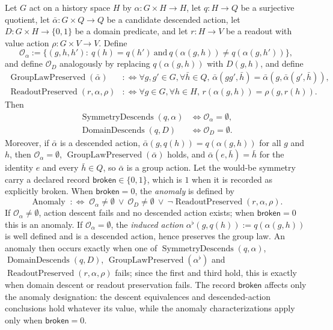 \begin{theorem}\label{thm:F40}
Let \(G\) act on a history space \(H\) by
\(\alpha:G\times H\to H\), let \(q:H\to Q\) be a surjective quotient,
let \(\bar\alpha:G\times Q\to Q\) be a candidate descended action,
let \(D:G\times H\to\{0,1\}\) be a domain predicate, and let
\(r:H\to V\) be a readout with value action
\(\rho:G\times V\to V\).  Define
\[
  \mathcal O_{\alpha}
  :=
  \{(g,h,h'):\ q(h)=q(h')\ \text{and}\
    q(\alpha(g,h))\ne q(\alpha(g,h'))\},
\]
and define \(\mathcal O_D\) analogously by replacing
\(q(\alpha(g,h))\) with \(D(g,h)\), and define
\begin{align*}
  \operatorname{GroupLawPreserved}(\bar\alpha)
  &:\Longleftrightarrow
  \forall g,g'\in G,\forall \bar h\in Q,\,
    \bar\alpha(gg',\bar h)=
    \bar\alpha(g,\bar\alpha(g',\bar h)),\\
  \operatorname{ReadoutPreserved}(r,\alpha,\rho)
  &:\Longleftrightarrow
  \forall g\in G,\forall h\in H,\,
    r(\alpha(g,h))=\rho(g,r(h)).
\end{align*}
Then
\begin{align*}
  \operatorname{SymmetryDescends}(q,\alpha)
  &\iff \mathcal O_{\alpha}=\emptyset,\\
  \operatorname{DomainDescends}(q,D)
  &\iff \mathcal O_D=\emptyset.
\end{align*}
Moreover, if \(\bar\alpha\) is a descended action,
\(\bar\alpha(g,q(h))=q(\alpha(g,h))\) for all \(g\) and \(h\), then
\(\mathcal O_\alpha=\emptyset\), \(\operatorname{GroupLawPreserved}(\bar\alpha)\)
holds, and \(\bar\alpha(e,\bar h)=\bar h\) for the identity \(e\) and every
\(\bar h\in Q\), so \(\bar\alpha\) is a group action. Let the would-be symmetry carry a declared record
\(\mathsf{broken}\in\{0,1\}\), which is \(1\) when it is recorded as
explicitly broken. When \(\mathsf{broken}=0\), the \emph{anomaly} is defined by
\[
  \operatorname{Anomaly}
  \;:\iff\;
  \mathcal O_\alpha\ne\emptyset\ \lor\ \mathcal O_D\ne\emptyset\ \lor\
  \neg\operatorname{ReadoutPreserved}(r,\alpha,\rho).
\]
If \(\mathcal O_\alpha\ne\emptyset\), action descent fails and no descended
action exists; when \(\mathsf{broken}=0\) this is an anomaly. If \(\mathcal O_\alpha=\emptyset\), the
\emph{induced action} \(\alpha^{\flat}(g,q(h)):=q(\alpha(g,h))\) is well
defined and is a descended action, hence preserves the group law. An anomaly
then occurs exactly when one of \(\operatorname{SymmetryDescends}(q,\alpha)\),
\(\operatorname{DomainDescends}(q,D)\),
\(\operatorname{GroupLawPreserved}(\alpha^{\flat})\) and
\(\operatorname{ReadoutPreserved}(r,\alpha,\rho)\) fails; since the first and
third hold, this is exactly when domain descent or readout preservation
fails. The record \(\mathsf{broken}\) affects only the anomaly designation:
the descent equivalences and descended-action conclusions hold whatever
its value, while the anomaly characterizations apply only when
\(\mathsf{broken}=0\).
\end{theorem}
